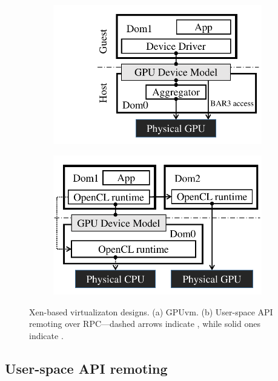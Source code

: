 \begin{figure}[!th]
	\centering
	\begin{subfigure}{.45\columnwidth}
		\includegraphics[width=\columnwidth,trim={2cm 0cm 0cm 0cm},clip]{trillium/images/design/gpuvm.pdf}
		\caption{{}}
		\label{fig_gpuvm_basic}
	\end{subfigure}\hfill
	\begin{subfigure}{.55\columnwidth}
		\includegraphics[width=\columnwidth,trim={0 0 0 0},clip]{trillium/images/design/api-remote.pdf}
		\caption{{}}
		\label{fig:api_remote}
	\end{subfigure}
	\caption{{\footnotesize Xen-based virtualizaton designs. (a) GPUvm. (b) User-space API remoting over RPC---dashed arrows indicate \apicpu, while solid ones indicate \apigpu.}}
\end{figure}

\subsection{User-space API remoting}

